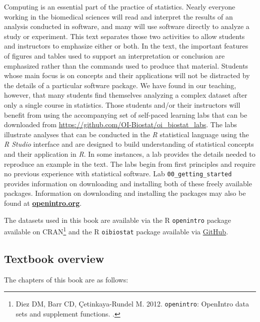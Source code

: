 Computing is an essential part of the practice of statistics.  Nearly everyone working in the biomedical sciences will read and interpret the results of an analysis conducted in software, and many will use software directly to analyze a study or experiment.  This text separates those two activities to allow students and instructors to emphasize either or both.  In the text, the important features of figures and tables used to support an interpretation or conclusion are emphasized rather than the commands used to produce that material.  Students whose main focus is on concepts and their applications will not be distracted by the details of a particular software package.  We have found in our teaching, however, that many students find themselves analyzing a complex dataset after only a single course in statistics.  Those students and/or their instructors will benefit from using the accompanying set of self-paced learning labs that can be downloaded from \url{https://github.com/OI-Biostat/oi_biostat_labs}.  The labs illustrate analyses that can be conducted in the \textsl{R} statistical language using the \textsl{R Studio} interface and are designed to build understanding of statistical concepts and their application in \textsl{R}. In some instances, a lab provides the details needed to reproduce an example in the text. The labs begin from first principles and require no previous experience with statistical software.  Lab \texttt{00\_getting\_started} provides information on downloading and installing both of these freely available packages. Information on downloading and installing the packages may also be found at \href{http://www.openintro.org}{\color{black}\textbf{openintro.org}}. 

The datasets used in this book are available via the \textsf{R} \texttt{openintro} package available on CRAN\footnote{Diez DM, Barr CD, \c{C}etinkaya-Rundel M. 2012. \texttt{openintro}: OpenIntro data sets and supplement functions. .}  and the \textsf{R} \texttt{oibiostat} package available via \href{<https://github.com/OI-Biostat/oi_biostat_data>}{GitHub}.

\subsection*{Textbook overview}

The chapters of this book are as follows:

